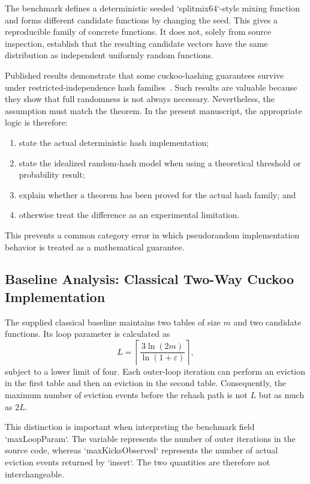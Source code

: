 \documentclass[conference]{IEEEtran}
\begin{document}
The benchmark defines a deterministic seeded `splitmix64`-style mixing function and forms different candidate functions by changing the seed. This gives a reproducible family of concrete functions. It does not, solely from source inspection, establish that the resulting candidate vectors have the same distribution as independent uniformly random functions.

Published results demonstrate that some cuckoo-hashing guarantees survive under restricted-independence hash families~\cite{aumuller2014explicit}. Such results are valuable because they show that full randomness is not always necessary. Nevertheless, the assumption must match the theorem. In the present manuscript, the appropriate logic is therefore:
\begin{enumerate}
    \item state the actual deterministic hash implementation;
    \item state the idealized random-hash model when using a theoretical threshold or probability result;
    \item explain whether a theorem has been proved for the actual hash family; and
    \item otherwise treat the difference as an experimental limitation.
\end{enumerate}
This prevents a common category error in which pseudorandom implementation behavior is treated as a mathematical guarantee.

\subsection{Baseline Analysis: Classical Two-Way Cuckoo Implementation}

The supplied classical baseline maintains two tables of size $m$ and two candidate functions. Its loop parameter is calculated as
\begin{equation}
    L=\left\lceil
        \frac{3\ln(2m)}{\ln(1+\varepsilon)}
      \right\rceil,
    \label{eq:baseline-maxloop}
\end{equation}
subject to a lower limit of four. Each outer-loop iteration can perform an eviction in the first table and then an eviction in the second table. Consequently, the maximum number of eviction events before the rehash path is not $L$ but as much as $2L$.

This distinction is important when interpreting the benchmark field `maxLoopParam`. The variable represents the number of outer iterations in the source code, whereas `maxKicksObserved` represents the number of actual eviction events returned by `insert`. The two quantities are therefore not interchangeable.
\end{document}
